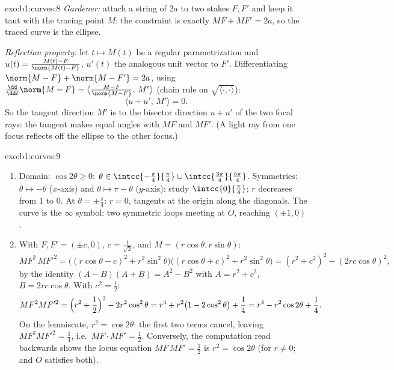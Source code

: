 \begin{solution}{exo:b1:curves:8}
\emph{Gardener:} attach a string of  $2a$ to two stakes $F,
F'$ and keep it taut with the tracing point $M$: the constraint is
exactly $MF + MF' = 2a$, so the traced curve is the ellipse.

\emph{Reflection property:} let $t \mapsto M(t)$ be a regular
parametrization and $u(t) = \frac{M(t) - F}{\norm{M(t) - F}}$,
$u'(t)$ the analogous unit vector to $F'$. Differentiating
$\norm{M - F} + \norm{M - F'} = 2a$, using $\frac{\dd}{\dd
t}\norm{M - F} = \bigl\langle \frac{M - F}{\norm{M-F}},\,
M'\bigr\rangle$ (chain rule on $\sqrt{\langle\cdot,\cdot\rangle}$):
\[
\bigl\langle u + u',\, M'\bigr\rangle = 0 .
\]
So the tangent direction $M'$ is  to the bisector
direction $u + u'$ of the two focal rays: the tangent makes equal
angles with $MF$ and $MF'$. (A light ray from one focus reflects
off the ellipse to the other focus.)
\end{solution}

\begin{solution}{exo:b1:curves:9}
\begin{enumerate}
  \item Domain: $\cos 2\theta \geq 0$: $\theta \in
        \intcc{-\frac\pi4}{\frac\pi4} \cup
        \intcc{\frac{3\pi}{4}}{\frac{5\pi}{4}}$. Symmetries: $\theta
        \mapsto -\theta$ ($x$-axis) and $\theta \mapsto \pi -
        \theta$ ($y$-axis): study $\intcc{0}{\frac\pi4}$; $r$
        decreases from $1$ to $0$. At $\theta = \pm\frac\pi4$: $r =
        0$, tangents at the origin along the diagonals. The curve is
        the $\infty$ symbol: two symmetric loops meeting at $O$,
        reaching $(\pm 1, 0)$.
  \item With $F, F' = (\pm c, 0)$, $c = \frac{1}{\sqrt 2}$, and $M
        = (r\cos\theta, r\sin\theta)$:
        \[
        MF^2\, MF'^2
        = \bigl((r\cos\theta - c)^2 + r^2\sin^2\theta\bigr)
        \bigl((r\cos\theta + c)^2 + r^2\sin^2\theta\bigr)
        = (r^2 + c^2)^2 - (2rc\cos\theta)^2 ,
        \]
        by the identity $(A - B)(A + B) = A^2 - B^2$ with $A = r^2
        + c^2$, $B = 2rc\cos\theta$. With $c^2 = \frac12$:
        \[
        MF^2 MF'^2 = \Bigl(r^2 + \frac12\Bigr)^2 - 2r^2\cos^2\theta
        = r^4 + r^2\bigl(1 - 2\cos^2\theta\bigr) + \frac14
        = r^4 - r^2\cos 2\theta + \frac14 .
        \]
        On the lemniscate, $r^2 = \cos 2\theta$: the first two terms
        cancel, leaving $MF^2MF'^2 = \frac14$, i.e.\ $MF \cdot MF' =
        \frac12$. Conversely, the computation read backwards shows
        the locus equation $MF\,MF' = \frac12$ is $r^2 = \cos
        2\theta$ (for $r \neq 0$; and $O$ satisfies both).
\end{enumerate}
\end{solution}

